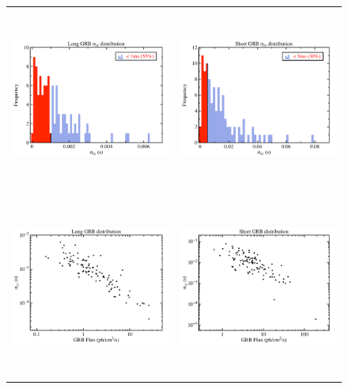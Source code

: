 \documentclass[]{spie}  %
\begin{document}
\begin{figure}
\begin{center}
\begin{tabular}{cc}
\includegraphics[height=6cm]{Long_GRB_sigma_dist} &
\includegraphics[height=6cm]{short_GRB_sigma_dist} \\
\includegraphics[height=6cm]{Long_GRB_sigma_flux} &
\includegraphics[height=6cm]{short_GRB_sigma_flux} \\

\end{tabular}
\end{center}
\end{figure}
\end{document}
